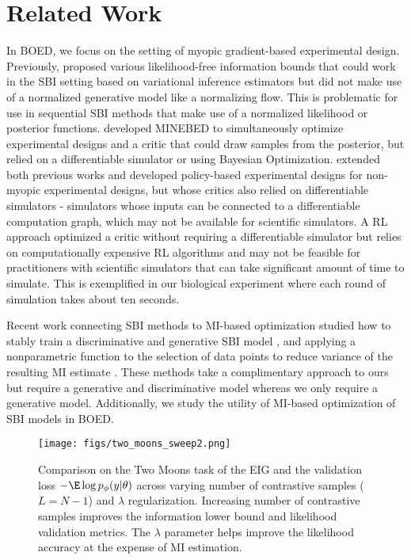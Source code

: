 \section{Related Work}
\label{sec:related_work}

In BOED, we focus on the setting of myopic gradient-based experimental design. Previously, \citet{Foster2019} proposed various likelihood-free information bounds that could work in the SBI setting based on variational inference estimators but did not make use of a normalized generative model like a normalizing flow. This is problematic for use in sequential SBI methods that make use of a normalized likelihood or posterior functions. \citet{Kleinegesse2020b} developed MINEBED to simultaneously optimize experimental designs and a critic that could draw samples from the posterior, but relied on a differentiable simulator or using Bayesian Optimization. \citet{ivanova2021implicit} extended both previous works and developed policy-based experimental designs for non-myopic experimental designs, but whose critics also relied on differentiable simulators - simulators whose inputs can be connected to a differentiable computation graph, which may not be available for scientific simulators. A RL approach \citep{lim2022policybased} optimized a critic without requiring a differentiable simulator but relies on computationally expensive RL algorithms and may not be feasible for practitioners with scientific simulators that can take significant amount of time to simulate. This is exemplified in our biological experiment where each round of simulation takes about ten seconds. 

Recent work connecting SBI methods to MI-based optimization studied how to stably train a discriminative and generative SBI model \citep{miller2023simulation}, and applying a nonparametric function to the selection of data points to reduce variance of the resulting MI estimate \citep{glaser2022maximum}. These methods take a complimentary approach to ours but require a generative and discriminative model whereas we only require a generative model. Additionally, we study the utility of MI-based optimization of SBI models in BOED.

\begin{figure*}[!t]
  \centering
  \texttt{[image: figs/two\_moons\_sweep2.png]}
  \vspace{-9pt}
  \caption{Comparison on the Two Moons task of the EIG and the validation loss $-\E \log p_\phi(y | \theta)$ across varying number of contrastive samples ($L = N - 1$) and $\lambda$ regularization. Increasing number of contrastive samples improves the information lower bound and likelihood validation metrics.  The $\lambda$ parameter helps improve the likelihood accuracy at the expense of MI estimation.
  } %
  \label{fig:two_moons}
  \vspace{-12pt}
\end{figure*}